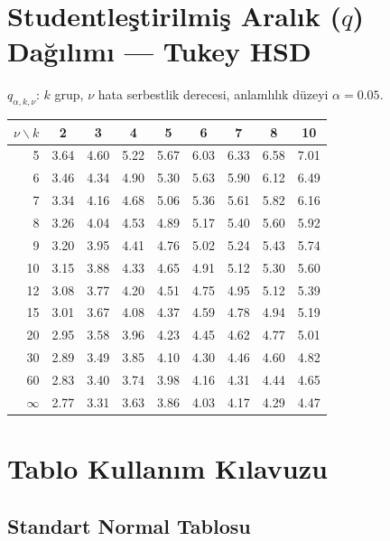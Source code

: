 \section{Studentleştirilmiş Aralık ($q$) Dağılımı --- Tukey HSD}
\label{app:q_tablo}

$q_{\alpha,k,\nu}$: $k$ grup, $\nu$ hata serbestlik derecesi, anlamlılık düzeyi $\alpha=0.05$.

\begin{center}
\small
\renewcommand{\arraystretch}{1.12}
\begin{tabular}{r|cccccccc}
\hline
$\nu \backslash k$ & 2 & 3 & 4 & 5 & 6 & 7 & 8 & 10 \\
\hline
5  & 3.64 & 4.60 & 5.22 & 5.67 & 6.03 & 6.33 & 6.58 & 7.01 \\
6  & 3.46 & 4.34 & 4.90 & 5.30 & 5.63 & 5.90 & 6.12 & 6.49 \\
7  & 3.34 & 4.16 & 4.68 & 5.06 & 5.36 & 5.61 & 5.82 & 6.16 \\
8  & 3.26 & 4.04 & 4.53 & 4.89 & 5.17 & 5.40 & 5.60 & 5.92 \\
9  & 3.20 & 3.95 & 4.41 & 4.76 & 5.02 & 5.24 & 5.43 & 5.74 \\
10 & 3.15 & 3.88 & 4.33 & 4.65 & 4.91 & 5.12 & 5.30 & 5.60 \\
12 & 3.08 & 3.77 & 4.20 & 4.51 & 4.75 & 4.95 & 5.12 & 5.39 \\
15 & 3.01 & 3.67 & 4.08 & 4.37 & 4.59 & 4.78 & 4.94 & 5.19 \\
20 & 2.95 & 3.58 & 3.96 & 4.23 & 4.45 & 4.62 & 4.77 & 5.01 \\
30 & 2.89 & 3.49 & 3.85 & 4.10 & 4.30 & 4.46 & 4.60 & 4.82 \\
60 & 2.83 & 3.40 & 3.74 & 3.98 & 4.16 & 4.31 & 4.44 & 4.65 \\
$\infty$ & 2.77 & 3.31 & 3.63 & 3.86 & 4.03 & 4.17 & 4.29 & 4.47 \\
\hline
\end{tabular}
\end{center}

\section{Tablo Kullanım Kılavuzu}
\label{app:tablo_kilavuz}

\subsection{Standart Normal Tablosu}

